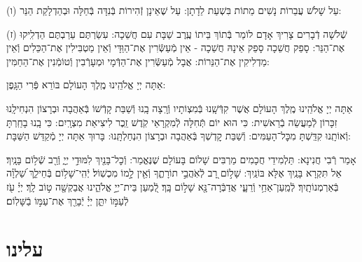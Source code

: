 \documentclass[twoside, openany, parskip=half, 11pt]{book}
\begin{document}
(ו) עַל שָׁלֹשׁ עֲבֵרוֹת נָשִׁים מֵתוֹת בִּשְׁעַת לֵדָתָן: עַל שֶׁאֵינָן זְֿהִירוֹת בְּֿנִדָּה בְּֿחַלָּה וּבְהַדְלָקַת הַנֵּר:

(ז) שְֿׁלֹשָׁה דְֿבָרִים צָרִיךְ אָדָם לוֹמַר בְּֿתוֹךְ בֵּיתוֹ עֶֽרֶב שַׁבָּת עִם חֲשֵׁכָה: עִשַׂרְתֶּם עֵרַבְתֶּם הַדְלִֽיקוּ אֶת־הַנֵּר: סָפֵק חֲשֵׁכָה סָפֵק אֵינָהּ חֲשֵׁכָה - אֵין מְֿעַשְּֿׂרִין אֶת־הַוַּדָּי וְֿאֵין מַטְבִּילִין אֶת־הַכֵּלִים וְֿאֵין מַדְלִיקִין אֶת־הַנֵּרוֹת: אֲבָל מְֿעַשְּֿׂרִין אֶת־הַדְּֿמָי וּמְעָרְֿבִין וְֿטוֹמְֿנִין אֶת־הַחַמִּין:



אַתָּה יְיָ אֱלֹהֵֽינוּ מֶֽלֶךְ הָעוֹלָם בּוֹרֵא פְּֿרִי הַגָּֽפֶן:

אַתָּה יְיָ אֱלֹהֵֽינוּ מֶֽלֶךְ הָעוֹלָם אֲשֶׁר קִדְּֿשָֽׁנוּ בְּֿמִצְוֹתָיו וְֿרָֽצָה בָֽנוּ וְֿשַׁבַּת קָדְֿשׁוֹ בְּֿאַהֲבָה וּבְרָצוֹן הִנְחִילָֽנוּ זִכָּרוֹן לְֿמַעֲשֵׂה בְֿרֵאשִׁית: כִּי הוּא יוֹם תְּֿחִלָּה לְֿמִקְרָאֵי קֹֽדֶשׁ זֵֽכֶר לִיצִיאַת מִצְרָֽיִם: כִּי בָֽנוּ בָחַֽרְתָּ וְֿאוֹתָֽנוּ קִדַּֽשְׁתָּ מִכׇּל־הָעַמִּים: וְֿשַׁבַּת קׇדְשְׁךָ בְּֿאַהֲבָה וּבְרָצוֹן הִנְחַלְתָּֽנוּ: בָּרוּךְ אַתָּה יְיָ מְֿקַדֵּשׁ הַשַּׁבָּת:

\sepline

 
אָמַר רְֿבִי חֲנִינָא: תַּלְמִידֵי חֲכָמִים מַרְבִּים שָׁלוֹם בָּעוֹלָם שֶׁנֶּאֱמַר:
וְֿכׇל־בָּנַ֖יִךְ לִמּוּדֵ֣י יְיָ֑ וְֿרַ֖ב שְֿׁל֥וֹם בָּנָֽיִךְ׃ אַל תִּקְרָא בָּנַֽיִךְ אֶלָּא בּוֹנַֽיִךְ: שָׁל֣וֹם רָ֭ב לְֿאֹֽהֲבֵ֣י תוֹרָתֶ֑ךָ וְֿאֵ֖ין לָ֣מוֹ מִכְשֽׁוֹל׃ יְֿהִֽי־שָׁל֥וֹם בְּֿחֵילֵ֑ךְ שַׁ֝לְוָ֗ה בְּֿאַרְמְנוֹתָֽיִךְ׃  לְֿמַֽעַן־אַחַ֥י וְֿרֵעָ֑י אֲדַבְּֿרָה־נָּ֖א שָׁל֣וֹם בָּֽךְ׃ לְֿ֭מַעַן בֵּית־יְיָ֣ אֱלֹהֵ֑ינוּ אֲבַקְשָׁ֖ה ט֣וֹב לָֽךְ׃
יְיָ֗ עֹ֖ז לְֿעַמּ֣וֹ יִתֵּ֑ן יְיָ֓ יְֿבָרֵ֖ךְ אֶת־עַמּ֣וֹ בַֿשָּׁלֽוֹם׃


\mournerskaddish

\section*{ עלינו }
\aleinu



\end{document}
